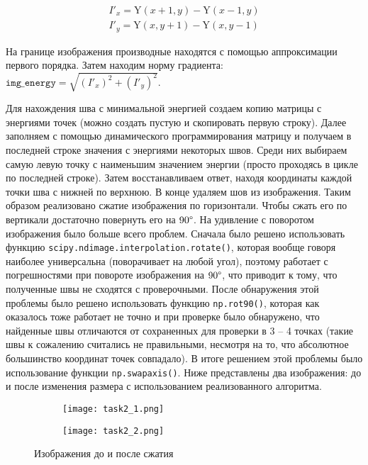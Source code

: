 \documentclass[12pt]{article}
\begin{document}
\begin{align*}
  I'_x = \mathrm{Y}(x + 1, y) - \mathrm{Y}(x - 1, y) \\
  I'_y = \mathrm{Y}(x, y + 1) - \mathrm{Y}(x, y - 1)
\end{align*}

На границе изображения производные находятся с помощью аппроксимации первого порядка. Затем находим норму градиента: $\texttt{img\_energy} = \sqrt{(I'_{x})^{2} + (I'_{y})^{2}}$.

Для нахождения шва с минимальной энергией создаем копию матрицы с энергиями точек (можно создать пустую и скопировать первую строку). Далее заполняем с помощью динамического программирования матрицу и получаем в последней строке значения с энергиями некоторых швов. Среди них выбираем самую левую точку с наименьшим значением энергии (просто проходясь в цикле по последней строке). Затем восстанавливаем ответ, находя координаты каждой точки шва с нижней по верхнюю. В конце удаляем шов из изображения. Таким образом реализовано сжатие изображения по горизонтали. Чтобы сжать его по вертикали достаточно повернуть его на $90 \degree$. На удивление с поворотом изображения было больше всего проблем. Сначала было решено использовать функцию \texttt{scipy.ndimage.interpolation.rotate()}, которая вообще говоря наиболее универсальна (поворачивает на любой угол), поэтому работает с погрешностями при повороте изображения на $90 \degree$, что приводит к тому, что полученные швы не сходятся с проверочными. После обнаружения этой проблемы было решено использовать функцию \texttt{np.rot90()}, которая как оказалось тоже работает не точно и при проверке было обнаружено, что найденные швы отличаются от сохраненных для проверки в 3 -- 4 точках (такие швы к сожалению считались не правильными, несмотря на то, что абсолютное большинство координат точек совпадало). В итоге решением этой проблемы было использование функции \texttt{np.swapaxis()}. Ниже представлены два изображения: до и после изменения размера с использованием реализованного алгоритма.

\begin{figure}[H]
  \begin{subfigure}{.5\textwidth}
    \texttt{[image: task2\_1.png]}
  \end{subfigure}
  \begin{subfigure}{.5\textwidth}
    \texttt{[image: task2\_2.png]}
  \end{subfigure}
  \caption{Изображения до и после сжатия}
\end{figure}
\end{document}
